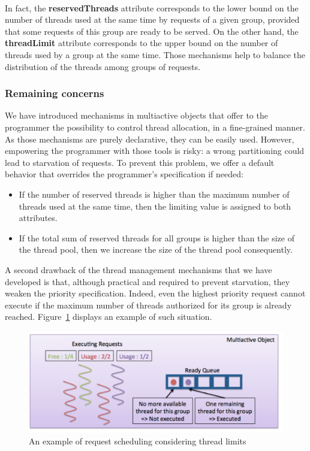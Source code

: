 \documentclass[11pt]{report}
\begin{document}
\paragraph{}
In fact, the \textbf{reservedThreads} attribute corresponds to the lower bound on the number of threads used at the same time by requests of a given group, provided that some requests of this group are ready to be served. On the other hand, the \textbf{threadLimit} attribute corresponds to the upper bound on the number of threads used by a group at the same time. Those mechanisms help to balance the distribution of the threads among groups of requests.

\subsubsection{Remaining concerns}
We have introduced mechanisms in multiactive objects that offer to the programmer the possibility to control thread allocation, in a fine-grained manner. As those mechanisms are purely declarative, they can be easily used. However, empowering the programmer with those tools is risky: a wrong partitioning could lead to starvation of requests. To prevent this problem, we offer a default behavior that overrides the programmer's specification if needed:
\begin{itemize}
\item If the number of reserved threads is higher than the maximum number of threads used at the same time, then the limiting value is assigned to both attributes.
\item If the total sum of reserved threads for all groups is higher than the size of the thread pool, then we increase the size of the thread pool consequently.
\end{itemize}
A second drawback of the thread management mechanisms that we have developed is that, although practical and required to prevent starvation, they weaken the priority specification. Indeed, even the highest priority request cannot execute if the maximum number of threads authorized for its group is already reached. Figure~\ref{fig:thread_limit} displays an example of such situation.

\begin{figure}[!ht]
      \begin{minipage}[c]{\textwidth}
      \centering
      \includegraphics[scale=0.5]{pictures/thread_limit.pdf}
      \end{minipage}
      \caption{An example of request scheduling considering thread limits}
      \label{fig:thread_limit} 
\end{figure}
\end{document}
